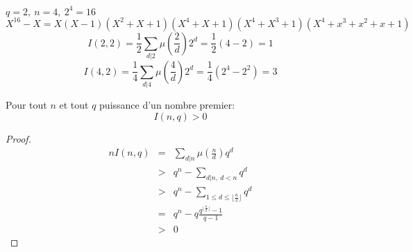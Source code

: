 \begin{exemple}
	$ q = 2, \ n = 4, \ 2^4 = 16 $
	$$	X ^16 - X = X(X-1)(X^2 + X + 1)(X^4 + X + 1)(X^4 + X^3 + 1)(X^4 + x^3 + x^2 + x + 1) $$
	$$	I(2,2) = \frac{1}{2}\sum_{d|2} \mu(\frac{2}{d}) 2^d = \frac{1}{2}(4-2) = 1$$
	$$	I(4,2) = \frac{1}{4}\sum_{d|4} \mu(\frac{4}{d}) 2^d = \frac{1}{4}(2^4 - 2^2) = 3$$
\end{exemple}



\begin{coro}
	Pour tout $n$ et tout $q$ puissance d'un nombre premier:
	$$ I (n, q) > 0 $$
\end{coro}


\begin{proof}
	\begin{eqnarray*}
		n I(n, q) & = & \sum_{d|n} \mu(\frac{n}{d}) q^d \\
		&>& q^n - \sum_{d|n,\ d < n} q^d \\
		&>& q^n - \sum_{1 \leq d\leq \lfloor \frac n 2 \rfloor} q^d \\
		&=& q^n - q\frac{q^{\lfloor \frac n 2 \rfloor} - 1}{q-1} \\
		&>& 0
	\end{eqnarray*}
\end{proof}

